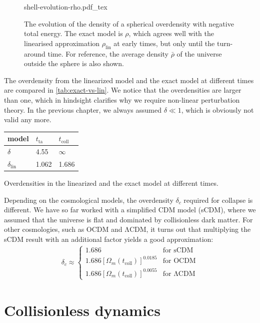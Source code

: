 \begin{figure}
	\centering
	{shell-evolution-rho.pdf_tex}
	\caption{The evolution of the density of a spherical overdensity with negative total energy. The exact model is $\rho$, which agrees well with the linearised approximation $\rho_\text{lin}$ at early times, but only until the turn-around time. For reference, the average density $\bar{\rho}$ of the universe outside the sphere is also shown.}
	\label{fig:shell-collapse-rho}
\end{figure}

The overdensity from the linearized model and the exact model at different times are compared in \cref{tab:exact-vs-lin}.
We notice that the overdensities are larger than one, which in hindsight clarifies why we require non-linear perturbation theory. In the previous chapter, we always assumed $\delta \ll 1$, which is obviously not valid any more.
\begin{margintable}
	\begin{tabular}{lll}
		\toprule
		model & $t_\text{ta}$ & $t_\text{coll}$\\
		\midrule
		$\delta$ & 4.55 & $\infty$\\
		$\delta_\text{lin}$ & 1.062 & 1.686\\
		\bottomrule
	\end{tabular}
	\caption{Overdensities in the linearized and the exact model at different times.}
	\label{tab:exact-vs-lin}
\end{margintable}

Depending on the cosmological models, the overdensity $\delta_c$ required for collapse is different. We have so far worked with a simplified CDM model (sCDM), where we assumed that the universe is flat and dominated by collisionless dark matter. For other cosmologies, such as OCDM and ΛCDM, it turns out that multiplying the sCDM result with an additional factor yields a good approximation:
\begin{align*}
	\delta_c \approx
	\begin{cases}
	1.686 & \text{for sCDM}\\
	1.686 [\Omega_m(t_\text{coll})]^{0.0185} & \text{for OCDM}\\
	1.686 [\Omega_m(t_\text{coll})]^{0.0055} & \text{for ΛCDM}
	\end{cases}
\end{align*}




\section{Collisionless dynamics}

